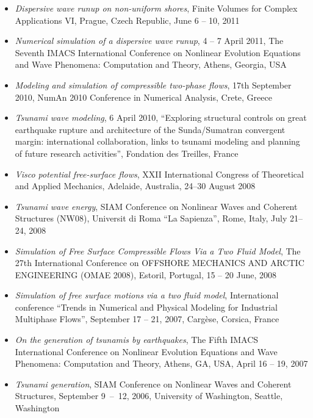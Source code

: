 \documentclass[final, a4paper, oneside, 12pt]{article}
\numberwithin{equation}{section}
\begin{document}
\begin{itemize}
  \item \textit{Dispersive wave runup on non-uniform shores}, Finite Volumes for Complex Applications VI, Prague, Czech Republic, June 6 -- 10, 2011
  
  \item \textit{Numerical simulation of a dispersive wave runup}, 4 -- 7 April 2011, The Seventh IMACS International Conference on Nonlinear Evolution Equations and Wave Phenomena: Computation and Theory, Athens, Georgia, USA
  
  \item \textit{Modeling and simulation of compressible two-phase flows}, 17th September 2010, NumAn 2010 Conference in Numerical Analysis, Crete, Greece
  
  \item \textit{Tsunami wave modeling}, 6 April 2010, ``Exploring structural controls on great earthquake rupture and architecture of the Sunda/Sumatran convergent margin: international collaboration, links to tsunami modeling and planning of future research activities'', Fondation des Treilles, France
  
  \item \textit{Visco potential free-surface flows}, XXII International Congress of Theoretical and Applied Mechanics, Adelaide, Australia, 24--30 August 2008
  
  \item \textit{Tsunami wave energy}, SIAM Conference on Nonlinear Waves and Coherent Structures (NW08), Universit di Roma ``La Sapienza'', Rome, Italy, July 21--24, 2008
  
  \item \textit{Simulation of Free Surface Compressible Flows Via a Two Fluid Model}, The 27th International Conference on OFFSHORE MECHANICS AND ARCTIC ENGINEERING (OMAE 2008), Estoril, Portugal, 15 -- 20 June, 2008
  
  \item \textit{Simulation of free surface motions via a two fluid model}, International conference ``Trends in Numerical and Physical Modeling for Industrial Multiphase Flows'', September 17 -- 21, 2007, Carg\`ese, Corsica, France
  
  \item \textit{On the generation of tsunamis by earthquakes}, The Fifth IMACS International Conference on Nonlinear Evolution Equations and Wave Phenomena: Computation and Theory, Athens, GA, USA, April 16 -- 19, 2007
  
  \item \textit{Tsunami generation}, SIAM Conference on Nonlinear Waves and Coherent Structures, September 9~--~12, 2006, University of Washington, Seattle, Washington
  
\end{itemize}
\end{document}
